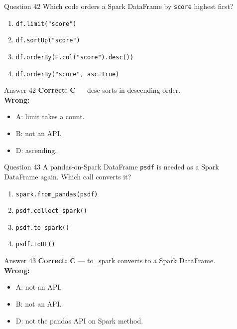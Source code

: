 \documentclass[aspectratio=169,11pt]{beamer}
\begin{document}
\begin{frame}{Question 42}
Which code orders a Spark DataFrame by \texttt{score} highest first?
\begin{enumerate}[label=\Alph*.]
\item \texttt{df.limit("score")}
\item \texttt{df.sortUp("score")}
\item \texttt{df.orderBy(F.col("score").desc())}
\item \texttt{df.orderBy("score", asc=True)}
\end{enumerate}
\end{frame}
\begin{frame}{Answer 42}
\textbf{Correct: C} --- desc sorts in descending order.\\
\vspace{0.5em}
\textbf{Wrong:}
\begin{itemize}
\item A: limit takes a count.
\item B: not an API.
\item D: ascending.
\end{itemize}
\end{frame}

\begin{frame}{Question 43}
A pandas-on-Spark DataFrame \texttt{psdf} is needed as a Spark DataFrame again. Which call converts it?
\begin{enumerate}[label=\Alph*.]
\item \texttt{spark.from\_pandas(psdf)}
\item \texttt{psdf.collect\_spark()}
\item \texttt{psdf.to\_spark()}
\item \texttt{psdf.toDF()}
\end{enumerate}
\end{frame}
\begin{frame}{Answer 43}
\textbf{Correct: C} --- to\_spark converts to a Spark DataFrame.\\
\vspace{0.5em}
\textbf{Wrong:}
\begin{itemize}
\item A: not an API.
\item B: not an API.
\item D: not the pandas API on Spark method.
\end{itemize}
\end{frame}
\end{document}
